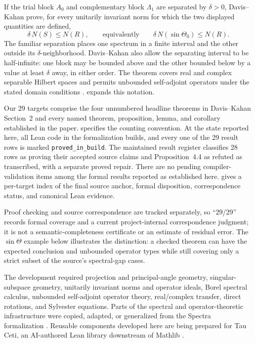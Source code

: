 \documentclass{article}
\begin{document}
If the trial block $A_0$ and complementary block $\Lambda_1$ are separated by
$\delta>0$, Davis--Kahan prove, for every unitarily invariant norm for which the
two displayed quantities are defined,
\begin{equation}
  \delta\,N(S)\le N(R),
  \qquad\text{equivalently}\qquad
  \delta\,N(\sin\Theta_0)\le N(R).
  \label{eq:sin-theta}
\end{equation}
The familiar separation places one spectrum in a finite interval and the other
outside its $\delta$-neighborhood.  Davis--Kahan also allow the separating
interval to be half-infinite: one block may be bounded above and the other
bounded below by a value at least $\delta$ away, in either order.  The theorem
covers real and complex separable Hilbert spaces and permits unbounded
self-adjoint operators under the stated domain conditions
\citep{davis1970rotation}.   expands this notation.

Our 29 targets comprise the four unnumbered headline theorems in Davis--Kahan
Section~2 and every named theorem, proposition, lemma, and corollary established
in the paper.  specifies the counting convention.  At the state
reported here, all Lean code in the formalization builds, and every one of the
29 result rows is marked \texttt{proved\_in\_build}.  The maintained result
register classifies 28 rows as proving their accepted source claims and
Proposition~4.4 as refuted as transcribed, with a separate proved repair.
There are no pending compiler-validation items among the formal results reported
as established here.
 gives a per-target index of the final source anchor,
formal disposition, correspondence status, and canonical Lean evidence.

Proof checking and source correspondence are tracked separately, so ``29/29''
records formal coverage and a current project-internal correspondence judgment;
it is not a semantic-completeness certificate or an estimate of residual error.
The $\sin\Theta$ example below illustrates the distinction: a checked theorem
can have the expected conclusion and unbounded operator types while still
covering only a strict subset of the source's spectral-gap cases.

The development required projection and principal-angle geometry,
singular-subspace geometry, unitarily invariant norms and operator ideals,
Borel spectral calculus, unbounded self-adjoint operator theory, real/complex
transfer, direct rotations, and Sylvester equations.  Parts of the spectral and
operator-theoretic infrastructure were copied, adapted, or generalized from the
Spectra formalization \citep{bornemann2026spectra}.  Reusable components developed
here are being prepared for Tau Ceti, an AI-authored Lean library downstream of
Mathlib \citep{tauceti2026}.
\end{document}
